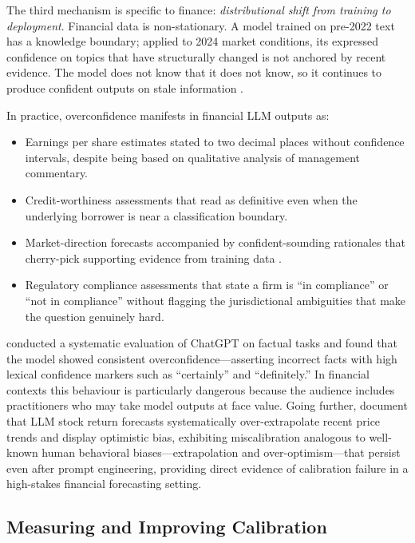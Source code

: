 The third mechanism is specific to finance: \emph{distributional shift from
training to deployment}. Financial data is non-stationary. A model trained on
pre-2022 text has a knowledge boundary; applied to 2024 market conditions, its
expressed confidence on topics that have structurally changed is not anchored by
recent evidence. The model does not know that it does not know, so it continues to
produce confident outputs on stale information \cite{zhao2025frontiers}.

In practice, overconfidence manifests in financial LLM outputs as:
\begin{itemize}
  \item Earnings per share estimates stated to two decimal places without confidence
        intervals, despite being based on qualitative analysis of management commentary.
  \item Credit-worthiness assessments that read as definitive even when the underlying
        borrower is near a classification boundary.
  \item Market-direction forecasts accompanied by confident-sounding rationales that
        cherry-pick supporting evidence from training data \cite{cfa2025llmguide}.
  \item Regulatory compliance assessments that state a firm is ``in compliance'' or
        ``not in compliance'' without flagging the jurisdictional ambiguities that make
        the question genuinely hard.
\end{itemize}

\citet{bang2023multitask} conducted a systematic evaluation of ChatGPT on factual
tasks and found that the model showed consistent overconfidence---asserting incorrect
facts with high lexical confidence markers such as ``certainly'' and ``definitely.''
In financial contexts this behaviour is particularly dangerous because the audience
includes practitioners who may take model outputs at face value. Going further,
\citet{ChenGreenGulenZhou2024} document that LLM stock return forecasts systematically
over-extrapolate recent price trends and display optimistic bias, exhibiting miscalibration
analogous to well-known human behavioral biases---extrapolation and over-optimism---that
persist even after prompt engineering, providing direct evidence of calibration failure
in a high-stakes financial forecasting setting.

\subsection{Measuring and Improving Calibration}
\label{sec:ch13-measuring-improving-calibration}

